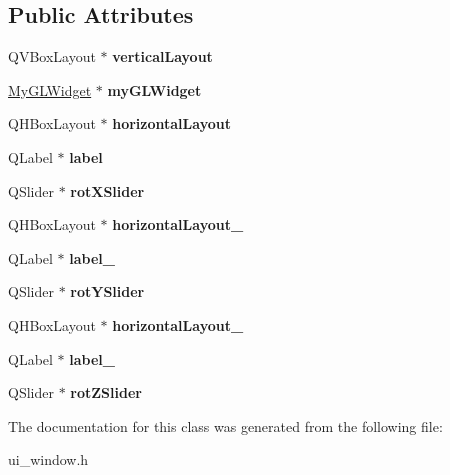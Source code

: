 \subsection*{Public Attributes}
\begin{DoxyCompactItemize}
\item 
\mbox{\label{class_ui___window_afb9bb0a79fe82f343bcfd69794590ae8}} 
Q\+V\+Box\+Layout $\ast$ {\bfseries vertical\+Layout}
\item 
\mbox{\label{class_ui___window_afdc55bf84d9d31159c56d7b1220077d0}} 
\mbox{\hyperlink{class_my_g_l_widget}{My\+G\+L\+Widget}} $\ast$ {\bfseries my\+G\+L\+Widget}
\item 
\mbox{\label{class_ui___window_a167433b4f13baf636c5449a47327c957}} 
Q\+H\+Box\+Layout $\ast$ {\bfseries horizontal\+Layout}
\item 
\mbox{\label{class_ui___window_af91af662a3516cccfdfddb0ac0c6c32c}} 
Q\+Label $\ast$ {\bfseries label}
\item 
\mbox{\label{class_ui___window_a8b0d45d82bee3eec8c9e44e88fd7bb94}} 
Q\+Slider $\ast$ {\bfseries rot\+X\+Slider}
\item 
\mbox{\label{class_ui___window_a2d5fbd674cd5e137b9f482a12762ac48}} 
Q\+H\+Box\+Layout $\ast$ {\bfseries horizontal\+Layout\+\_}
\item 
\mbox{\label{class_ui___window_aab7d650781ef514a9abb6a83fb44317e}} 
Q\+Label $\ast$ {\bfseries label\+\_}
\item 
\mbox{\label{class_ui___window_a67120fe99326079b0f332ef837289915}} 
Q\+Slider $\ast$ {\bfseries rot\+Y\+Slider}
\item 
\mbox{\label{class_ui___window_ace5df3a15fbcf6208783b7198e7d9a42}} 
Q\+H\+Box\+Layout $\ast$ {\bfseries horizontal\+Layout\+\_}
\item 
\mbox{\label{class_ui___window_a42fbf07a01626d3d90c0606592d5ff91}} 
Q\+Label $\ast$ {\bfseries label\+\_}
\item 
\mbox{\label{class_ui___window_a7a412845d75ad8b4f85959a6afba9685}} 
Q\+Slider $\ast$ {\bfseries rot\+Z\+Slider}
\end{DoxyCompactItemize}


The documentation for this class was generated from the following file\+:\begin{DoxyCompactItemize}
\item 
ui\+\_\+window.\+h\end{DoxyCompactItemize}

